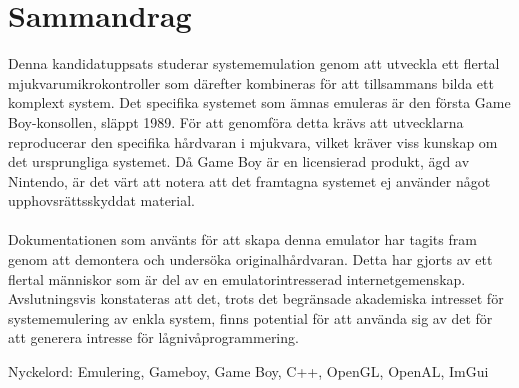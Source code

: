\thispagestyle{plain}			%
\setlength{\parskip}{0pt plus 1.0pt}
\section*{\centering Sammandrag}
Denna kandidatuppsats studerar systememulation genom att utveckla ett flertal mjukvarumikrokontroller som därefter kombineras för att tillsammans bilda ett komplext system. Det specifika systemet som ämnas emuleras är den första Game Boy-konsollen, släppt 1989. För att genomföra detta krävs att utvecklarna reproducerar den specifika hårdvaran i mjukvara, vilket kräver viss kunskap om det ursprungliga systemet. 
Då Game Boy är en licensierad produkt, ägd av Nintendo, är det värt att notera att det framtagna systemet ej använder något upphovsrättsskyddat material.
\\\\
Dokumentationen som använts för att skapa denna emulator har tagits fram genom att demontera och undersöka originalhårdvaran. Detta har gjorts av ett flertal människor som är del av en emulatorintresserad internetgemenskap. Avslutningsvis konstateras att det, trots det begränsade akademiska intresset för systememulering av enkla system, finns potential för att använda sig av det för att generera intresse för lågnivåprogrammering.







\vfill
Nyckelord: Emulering, Gameboy, Game Boy, C++, OpenGL, OpenAL, ImGui

\newpage				%
\thispagestyle{plain}
\mbox{}